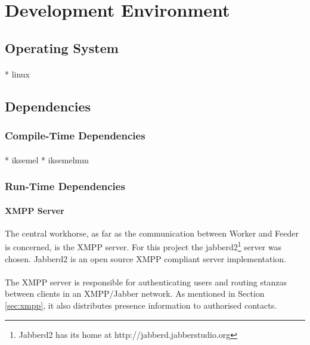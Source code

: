 \section{Development Environment}
\paragraph{}

\subsection{Operating System}
\paragraph{}
* linux


\subsection{Dependencies}
\label{sec:depend}

\subsubsection{Compile-Time Dependencies}
\paragraph{}
* iksemel
* iksemelmm

\subsubsection{Run-Time Dependencies}

\paragraph{XMPP Server}
The central workhorse, as far as the communication between Worker and Feeder is concerned, is the XMPP server. For this project the jabberd2\footnote{Jabberd2 has its home at http://jabberd.jabberstudio.org} server was chosen. Jabberd2 is an open source XMPP compliant server implementation.
\paragraph{}
The XMPP server is responsible for authenticating users and routing stanzas between clients in an XMPP/Jabber network. As mentioned in Section \ref{sec:xmpp}, it also distributes presence information to authorised contacts.

